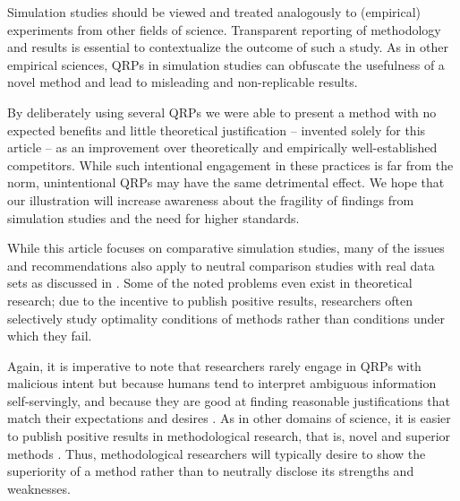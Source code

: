 \documentclass[a4paper, 11pt]{article}
\begin{document}
Simulation studies should be viewed and treated analogously to (empirical)
experiments from other fields of science. Transparent reporting of methodology
and results is essential to contextualize the outcome of such a study. As in
other empirical sciences, QRPs in simulation studies can obfuscate the usefulness
of a novel method and lead to misleading and non-replicable results.

By deliberately using several QRPs we were able to present a method with no expected
benefits and little theoretical justification -- invented solely for this article -- as an
improvement over theoretically and empirically well-established competitors.
While such intentional engagement in these practices is far from the norm,
unintentional QRPs may have the same detrimental effect.
We hope that our illustration will increase awareness about the fragility of
findings from simulation studies and the need for higher standards.

While this article focuses on comparative simulation studies, many of the issues
and recommendations also apply to neutral comparison studies with real data sets
as discussed in \citet{Niessl2021}. Some of the noted problems even exist in
theoretical research; due to the incentive to publish positive results, researchers
often selectively study optimality conditions of methods rather than conditions
under which they fail.

Again, it is imperative to note that researchers rarely engage in QRPs with malicious
intent but because humans tend to interpret ambiguous information self-servingly, and
because they are good at finding reasonable justifications that match their expectations
and desires \citep{Simmons2011}. As in other domains of science, it is easier to publish
positive results in methodological research, that is, novel and superior methods
\citep{Boulesteix2015}. Thus, methodological researchers will typically desire to show
the superiority of a method rather than to neutrally disclose its strengths and
weaknesses.
\end{document}
